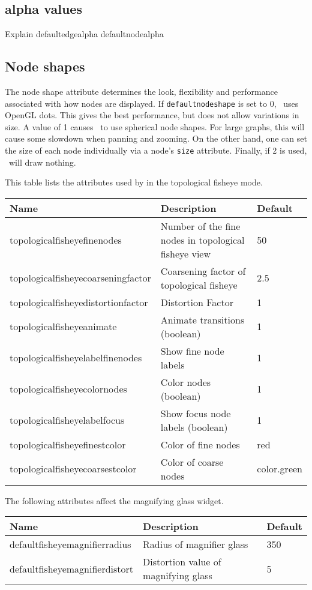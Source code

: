 \subsection{alpha values}
Explain defaultedgealpha defaultnodealpha

\subsection{Node shapes}
The node shape attribute determines the look, flexibility and performance associated
with how nodes are displayed. If {\tt defaultnodeshape} is set to 0, \smyrna\ uses
OpenGL dots. This gives the best performance, but does not allow variations in size.
A value of 1 causes \smyrna\ to use spherical node shapes. For large graphs, this will
cause some slowdown when panning and zooming. On the other hand, one can set the
size of each node individually via a node's {\tt size} attribute.
Finally, if 2 is used, \smyrna\ will draw nothing.

\newpage
This table lists the attributes used by \smyrna
in the topological fisheye mode.\\
{\footnotesize
\begin{tabular}[t]{|l|p{3.0in}|l|} \hline
{\bf Name} & {\bf Description} & {\bf Default} \\ \hline
topologicalfisheyefinenodes & Number of the fine nodes in topological fisheye view & 50 \\ 
topologicalfisheyecoarseningfactor & Coarsening factor of topological fisheye & 2.5 \\ 
topologicalfisheyedistortionfactor & Distortion Factor & 1 \\
topologicalfisheyeanimate & Animate transitions (boolean) & 1 \\
topologicalfisheyelabelfinenodes & Show fine node labels & 1 \\
topologicalfisheyecolornodes & Color nodes (boolean) & 1 \\ 
topologicalfisheyelabelfocus & Show focus node labels (boolean) & 1 \\
topologicalfisheyefinestcolor & Color of fine nodes & red \\ 
topologicalfisheyecoarsestcolor & Color of coarse nodes & color.green \\ \hline
\end{tabular}
}

The following attributes affect the magnifying glass widget.\\
{\footnotesize
\begin{tabular}[t]{|l|p{3.0in}|l|} \hline
{\bf Name} & {\bf Description} & {\bf Default} \\ \hline
defaultfisheyemagnifierradius & Radius of magnifier glass & 350 \\ 
defaultfisheyemagnifierdistort & Distortion value of magnifying glass & 5 \\ \hline
\end{tabular}
}

